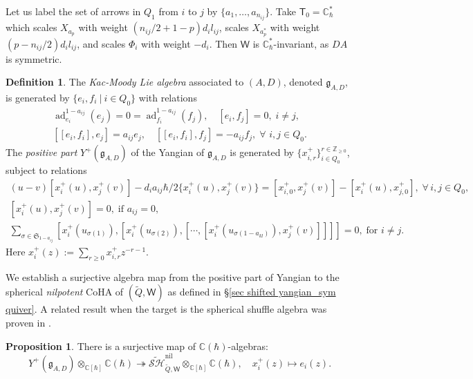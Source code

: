 \documentclass[10pt]{amsart}
\theoremstyle{definition}
\newtheorem{Proposition}[Theorem]{Proposition}
\newtheorem{Definition}[Theorem]{Definition}
\numberwithin{equation}{section}
\newcommand{\bC}{\mathbb{C}}
\newcommand{\bZ}{\mathbb{Z}}
\newcommand{\sT}{\mathsf{T}}
\newcommand{\sW}{\mathsf{W}}
\newcommand{\ad}{\operatorname{ad}}
\begin{document}
Let us label the set of arrows in $Q_1$ from $i$ to $j$ by $\{a_1,\ldots,a_{n_{ij}}\}$. Take $\sT_0=\bC^*_\hbar$ which scales $X_{a_p}$ with weight $(n_{ij}/2+1-p)d_il_{ij}$, scales $X_{a^*_p}$ with weight $(p-n_{ij}/2)d_il_{ij}$, and scales $\Phi_i$ with weight $-d_i$. Then $\sW$ is $\bC^*_\hbar$-invariant, 
as $DA$ is symmetric. 
\begin{Definition}
The \textit{Kac-Moody Lie algebra} associated to $(A,D)$, denoted $\mathfrak{g}_{A,D}$, is generated by $\{e_i,f_i\:|\:i\in Q_0\}$ with relations
\begin{equation*}
\begin{gathered}
\ad_{e_i}^{1-a_{ij}}(e_j)=0=\ad_{f_i}^{1-a_{ij}}(f_j),\quad [e_i,f_j]=0,\;i\neq j,\\
[[e_i,f_i],e_j]=a_{ij}e_j,\quad [[e_i,f_i],f_j]=-a_{ij}f_j,\;\forall \,\, i,j\in Q_0.
\end{gathered}
\end{equation*}
The \textit{positive part} $Y^+(\mathfrak{g}_{A,D})$ of the Yangian of $\mathfrak{g}_{A,D}$ \cite{GTL,YZ3} is generated by $\{x^+_{i,r}\}_{i\in Q_0}^{r\in \bZ_{\geqslant 0}}$, subject to relations
\begin{equation}\label{relation for Y^+(sym KM)}
\begin{gathered}
(u-v)[x^+_i(u),x^+_j(v)]-d_ia_{ij}\hbar/2\{x^+_i(u),x^+_j(v)\}=[x^+_{i,0},x^+_j(v)]-[x^+_i(u),x^+_{j,0}],\;\forall \, i,j\in Q_0,\\
[x^+_i(u),x^+_j(v)]=0,\;\text{if }a_{ij}=0,\\
\sum_{\sigma\in \mathfrak{S}_{1-a_{ij}}} [x^+_i(u_{\sigma(1)}),[x^+_i(u_{\sigma(2)}),[\cdots,[x^+_i(u_{\sigma(1-a_{kl})}),x^+_j(v)]]]]=0,\; \text{for } i\neq j.
\end{gathered}
\end{equation}
Here $x^+_i(z):=\sum_{r\geqslant 0}x^+_{i,r}z^{-r-1}$.
\end{Definition}
We establish a surjective algebra map from the positive part of Yangian to the spherical \textit{nilpotent} CoHA of $(\widetilde{Q},\sW)$ as defined in \S \ref{sec shifted yangian_sym quiver}. A related result when the target is the spherical shuffle algebra was proven in \cite[Thm.~5.1]{YZ3}.
\begin{Proposition}\label{prop Y^+(sym KM) to COHA}
There is a surjective map of $\bC(\hbar)$-algebras:
$$Y^+(\mathfrak{g}_{A,D})\otimes_{\bC[\hbar]}\bC(\hbar)\twoheadrightarrow \widetilde{\mathcal{SH}}^{\mathrm{nil}}_{\widetilde{Q},\sW}\otimes_{\bC[\hbar]}\bC(\hbar),\quad x^+_i(z)\mapsto e_i(z).$$
\end{Proposition}
\end{document}
